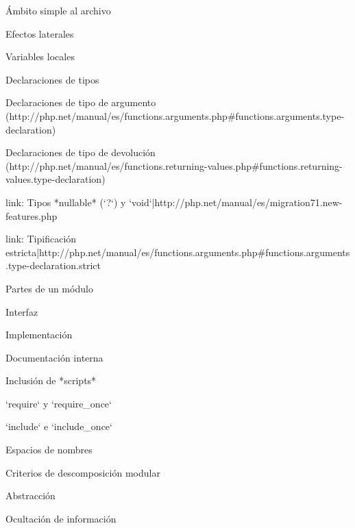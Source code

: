 \begin{longenum}
\begin{longenum}
\begin{longenum}
\begin{longenum}
                \begin{longenum}
                    \item Ámbito simple al archivo
                    \item Efectos laterales
                \end{longenum}
                \item Variables locales
            \end{longenum}
            \item Declaraciones de tipos
            \begin{longenum}
                \item [Declaraciones de tipo de argumento](http://php.net/manual/es/functions.arguments.php#functions.arguments.type-declaration)
                \item [Declaraciones de tipo de devolución](http://php.net/manual/es/functions.returning-values.php#functions.returning-values.type-declaration)
                \item [link: Tipos *nullable* (`?`) y `void`|http://php.net/manual/es/migration71.new-features.php]
                \item [link: Tipificación estricta|http://php.net/manual/es/functions.arguments.php#functions.arguments.type-declaration.strict]
            \end{longenum}
        \end{longenum}
        \item Partes de un módulo
        \begin{longenum}
            \item Interfaz
            \item Implementación
            \item Documentación interna
        \end{longenum}
        \item Inclusión de *scripts*
        \begin{longenum}
            \item `require` y `require_once`
            \item `include` e `include_once`
        \end{longenum}
        \item Espacios de nombres
        \item Criterios de descomposición modular
        \begin{longenum}
            \item Abstracción
            \item Ocultación de información

\end{longenum}
\end{longenum}
\end{longenum}
